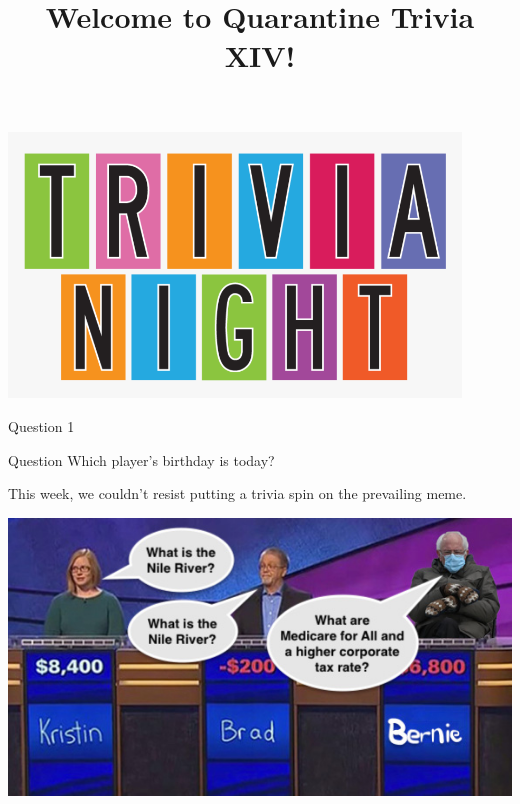 \documentclass[11pt]{beamer}
\begin{document}
\title{Welcome to Quarantine Trivia XIV!}
\date{}

\begin{frame}
\titlepage{}
\begin{center}
\includegraphics[max width=0.9\textwidth,
    max height=0.4\textheight]{Images/triviatitleframelogo.png}
\end{center}
\end{frame}

\begin{frame}[t]{Question 1}
\vspace{-0.5em}
\begin{block}{Question}
Which player's birthday is today?
\end{block}

\end{frame}

\begin{frame}
This week, we couldn't resist putting a trivia spin on the prevailing meme.
\pause
\begin{center}
\includegraphics[max width=.95\textwidth,
max height=0.55\textheight]{Images/bernie.jpg}
\end{center}
\end{frame}
\end{document}
